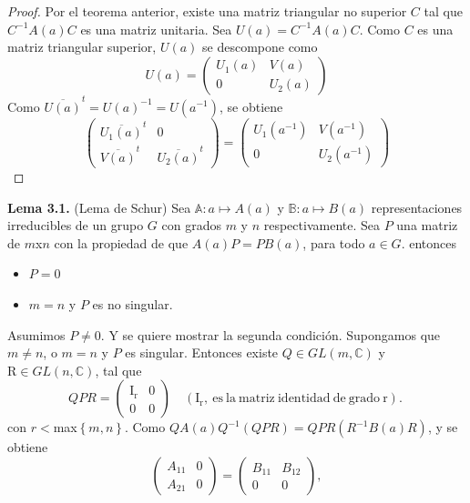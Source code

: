 \documentclass[12pt]{book}
\theoremstyle{definition}
\newcounter{in}
\begin{document}
\begin{proof}
Por el teorema anterior, existe una matriz triangular no superior $C$
tal que $C^{-1}A(a)C$ es una matriz unitaria. Sea
$U(a)=C^{-1}A(a)C$. Como $C$ es una matriz triangular superior, $U(a)$
se descompone como
\begin{equation*}
  U(a)=
  \begin{pmatrix}
    U_{1}(a) & V(a) \\ 
    0 & U_{2}(a)
  \end{pmatrix}
\end{equation*}  
Como $\overline{U(a)}^{t}=U(a)^{-1}=U(a^{-1})$, se obtiene
\begin{equation*}
  \begin{pmatrix}
    \overline{U_{1}(a)}^{t} & 0 \\ 
    \overline{V(a)}^{t} & \overline{U_{2}(a)}^{t}
  \end{pmatrix}
  =
  \begin{pmatrix}
    U_{1}(a^{-1}) & V(a^{-1}) \\ 
    0 & U_{2}(a^{-1})
  \end{pmatrix}
\end{equation*}
\end{proof}
\textbf{Lema 3.1.} (Lema de Schur) Sea
$\mathbb{A} \colon a \mapsto A\left(a\right)$ y
$\mathbb{B} \colon a \mapsto B\left(a\right)$ representaciones
irreducibles de un grupo $G$ con grados $m$ y $n$ respectivamente. Sea
$P$ una matriz de $m$x$n$ con la propiedad de que $A(a)P=PB(a)$, para
todo $a \in G$.
entonces
\begin{itemize}
\item $P=0$
\item $m=n$ y $P$ es no singular.
\end{itemize}
Asumimos $P \neq 0$. Y se quiere mostrar la segunda
condición. Supongamos que $m \neq n$, o $m=n$ y $P$ es
singular. Entonces existe $Q \in GL(m,\mathbb{C})$ y
$\mathrm{R} \in GL(n,\mathbb{C})$, tal que
\begin{equation*}
  QPR=
  \begin{pmatrix}
    \mathrm{I_{r}} & 0 \\ 
    0 & 0
  \end{pmatrix} \quad \mathrm{(I_{r},\ es\ la\ matriz\ identidad\ de\ grado\ r).\ }
\end{equation*}  
con $r<$max$\left\{ m,n \right\}$. Como $QA(a)Q^{-1}(QPR) = QPR(R^{-1}B(a)R)$, y se obtiene
\begin{equation*}
  \begin{pmatrix}
    A_{11} & 0 \\ 
    A_{21} & 0
  \end{pmatrix}
  =
  \begin{pmatrix}
    B_{11} & B_{12} \\ 
    0 & 0
  \end{pmatrix},
\end{equation*}
\end{document}
